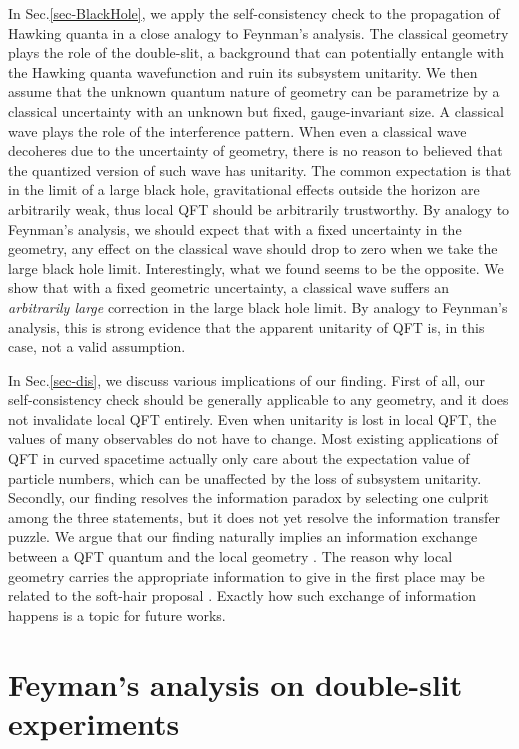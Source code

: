 \documentclass[aps,showpacs,onecolumn,floats,prd,superscriptaddress,nofootinbib]{revtex4-1}
\begin{document}
In Sec.\ref{sec-BlackHole}, we apply the self-consistency check to the propagation of Hawking quanta in a close analogy to Feynman's analysis. 
The classical geometry plays the role of the double-slit, a background that can potentially entangle with the Hawking quanta wavefunction and ruin its subsystem unitarity. 
We then assume that the unknown quantum nature of geometry can be parametrize by a classical uncertainty with an unknown but fixed, gauge-invariant size. 
A classical wave plays the role of the interference pattern. 
When even a classical wave decoheres due to the uncertainty of geometry, there is no reason to believed that the quantized version of such wave has unitarity.
The common expectation is that in the limit of a large black hole, gravitational effects outside the horizon are arbitrarily weak, thus local QFT should be arbitrarily trustworthy.
By analogy to Feynman's analysis, we should expect that with a fixed uncertainty in the geometry, any effect on the classical wave should drop to zero when we take the large black hole limit.
Interestingly, what we found seems to be the opposite. 
We show that with a fixed geometric uncertainty, a classical wave suffers an {\it arbitrarily large} correction in the large black hole limit.
By analogy to Feynman's analysis, this is strong evidence that the apparent unitarity of QFT is, in this case, not a valid assumption.

In Sec.\ref{sec-dis}, we discuss various implications of our finding. 
First of all, our self-consistency check should be generally applicable to any geometry, and it does not invalidate local QFT entirely. 
Even when unitarity is lost in local QFT, the values of many observables do not have to change. 
Most existing applications of QFT in curved spacetime actually only care about the expectation value of particle numbers, which can be unaffected by the loss of subsystem unitarity. 
Secondly, our finding resolves the information paradox by selecting one culprit among the three statements, but it does not yet resolve the information transfer puzzle. 
We argue that our finding naturally implies an information exchange between a QFT quantum and the local geometry \cite{OsuPag16}.
The reason why local geometry carries the appropriate information to give in the first place may be related to the soft-hair proposal \cite{HawPer16}. 
Exactly how such exchange of information happens is a topic for future works.

\section{Feyman's analysis on double-slit experiments}
\label{sec-DoubleSlit}
\end{document}
